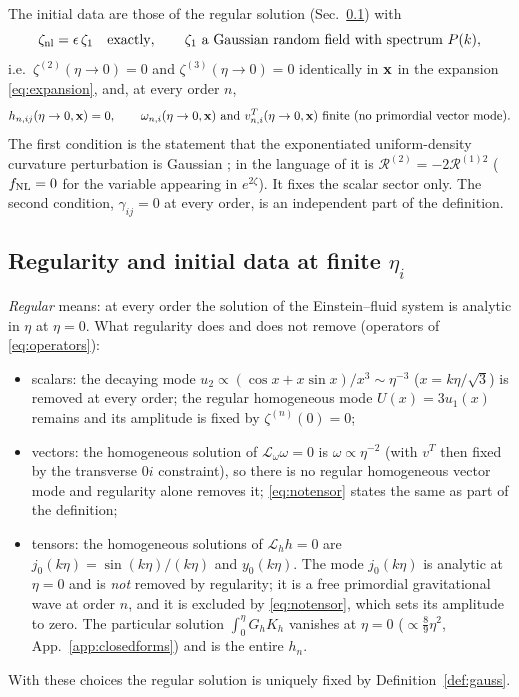 \begin{definition}\label{def:gauss}
The initial data are those of the regular solution (Sec.~\ref{sec:regular}) with
\begin{equation}
\zeta_{\rm nl}=\epsilon\,\zeta_1\quad\text{exactly},\qquad \zeta_1\ \text{a Gaussian random field with spectrum }P(k),
\label{eq:gauss}
\end{equation}
i.e.\ $\zeta^{(2)}(\eta\to0)=0$ and $\zeta^{(3)}(\eta\to0)=0$ identically in $\mathbf x$ in the expansion \eqref{eq:expansion}, and, at every order $n$,
\begin{equation}
h_{n,ij}(\eta\to0,\vx)=0,\qquad \omega_{n,i}(\eta\to0,\vx)\ \text{and}\ v^T_{n,i}(\eta\to0,\vx)\ \text{finite (no primordial vector mode)}.
\label{eq:notensor}
\end{equation}
The first condition is the statement that the exponentiated uniform-density curvature perturbation is Gaussian \cite{Maldacena};
in the language of \cite{PUB} it is $\mathcal R^{(2)}=-2\mathcal R^{(1)2}$ ($f_{\rm NL}=0$ for the variable appearing in $e^{2\zeta}$).
It fixes the scalar sector only.  The second condition, $\gamma_{ij}=0$ at every order, is an independent part of the definition.
\end{definition}

\subsection{Regularity and initial data at finite \texorpdfstring{$\eta_i$}{eta\_i}}
\label{sec:regular}
\emph{Regular} means: at every order the solution of the Einstein--fluid system is analytic in $\eta$ at
$\eta=0$.  What regularity does and does not remove (operators of \eqref{eq:operators}):
\begin{itemize}\itemsep1pt
\item scalars: the decaying mode $u_2\propto(\cos x+x\sin x)/x^3\sim\eta^{-3}$ ($x=k\eta/\sqrt3$) is removed at every order; the regular
homogeneous mode $U(x)=3u_1(x)$ remains and its amplitude is fixed by $\zeta^{(n)}(0)=0$;
\item vectors: the homogeneous solution of $\mathcal L_\omega\omega=0$ is $\omega\propto\eta^{-2}$ (with $v^T$ then fixed by the transverse
$0i$ constraint), so there is no regular homogeneous vector mode and regularity alone removes it; \eqref{eq:notensor} states the same
as part of the definition;
\item tensors: the homogeneous solutions of $\mathcal L_h h=0$ are $j_0(k\eta)=\sin(k\eta)/(k\eta)$ and $y_0(k\eta)$.  The mode
$j_0(k\eta)$ is analytic at $\eta=0$ and is \emph{not} removed by regularity; it is a free primordial gravitational wave at
order $n$, and it is excluded by \eqref{eq:notensor}, which sets its amplitude to zero.  The particular solution
$\int_0^\eta G_hK_h$ vanishes at $\eta=0$ ($\propto\tfrac89\eta^2$, App.~\ref{app:closedforms}) and is the entire $h_n$.
\end{itemize}
With these choices the regular solution is uniquely fixed by Definition~\ref{def:gauss}.

